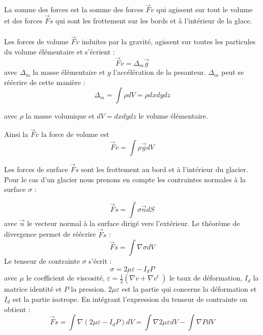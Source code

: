 \documentclass{article}
\begin{document}
La somme des forces est la somme des forces $\vec{F}v$ qui agissent sur tout le volume et des forces $\vec{F}s$ qui sont les frottement sur les bords et à l'intérieur de la glace.
\\\\
Les forces de volume  $\vec{F}v$ induites par la gravité, agissent sur toutes les particules du volume élémentaire et s'écrient :
\begin{equation}
\vec{F}v = \Delta_{m} \vec{g}
\end{equation}
avec $\Delta_{m}$ la masse élémentaire et $g$ l'accélération de la pesanteur.
$\Delta_{m}$ peut se réécrire de cette manière :  
\begin{equation}
\Delta_{m} = \int \rho dV = \rho dxdydz
\end{equation}

avec $\rho$ la masse volumique et $dV=dxdydz$ le volume élémentaire.

Ainsi la $\vec{F}v$ la force de volume est 
\begin{equation}
\vec{F}v = \int \rho \vec{g} dV
\end{equation}


\newpage

Les forces de surface $\vec{F}s$ sont les frottement au bord et à l'intérieur du glacier. Pour le cas d'un glacier nous prenons en compte les contraintes normales à la surface $\sigma$ : 

\begin{equation}
\vec{F}s = \int \sigma \vec{n} dS 
\end{equation}
avec $\vec{n}$ le vecteur normal à la surface dirigé vers l'extérieur.
Le théorème de divergence permet de réécrire $\vec{F}s$ :
\begin{equation}
\vec{F}s = \int \nabla \sigma dV 
\end{equation}
Le tenseur de contrainte $\sigma$ s'écrit : 
\begin{equation}
\sigma = 2 \mu \varepsilon - I_{d}P
\end{equation}
avec $\mu$ le coefficient de viscosité, $\varepsilon = \frac{1}{2}( \nabla v + \nabla v^t\ ) $ le taux de déformation, $I_{d}$ la matrice identité et $P$ la pression.  $2\mu \varepsilon$ est la partie qui concerne la déformation et $I_{d}$ est la partie isotrope. En intégrant l'expression du tenseur de contrainte on obtient :
\begin{equation}
\vec{F}s = \int \nabla(2 \mu \varepsilon - I_{d}P ) dV =  \int \nabla 2 \mu \varepsilon dV - \int \nabla P dV
\end{equation}
\end{document}
